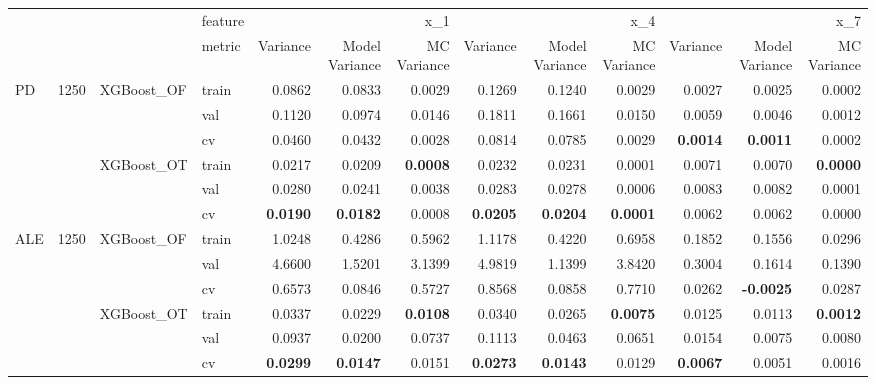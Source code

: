 \begin{tabular}{llllrrrrrrrrr}
 &  &  & feature & \multicolumn{3}{r}{x_1} & \multicolumn{3}{r}{x_4} & \multicolumn{3}{r}{x_7} \\
 &  &  & metric & Variance & Model Variance & MC Variance & Variance & Model Variance & MC Variance & Variance & Model Variance & MC Variance \\
\multirow[c]{6}{*}{PD} & \multirow[c]{6}{*}{1250} & \multirow[c]{3}{*}{XGBoost_OF} & train & 0.0862 & 0.0833 & 0.0029 & 0.1269 & 0.1240 & 0.0029 & 0.0027 & 0.0025 & 0.0002 \\
 &  &  & val & 0.1120 & 0.0974 & 0.0146 & 0.1811 & 0.1661 & 0.0150 & 0.0059 & 0.0046 & 0.0012 \\
 &  &  & cv & 0.0460 & 0.0432 & 0.0028 & 0.0814 & 0.0785 & 0.0029 & \bfseries 0.0014 & \bfseries 0.0011 & 0.0002 \\
 &  & \multirow[c]{3}{*}{XGBoost_OT} & train & 0.0217 & 0.0209 & \bfseries 0.0008 & 0.0232 & 0.0231 & 0.0001 & 0.0071 & 0.0070 & \bfseries 0.0000 \\
 &  &  & val & 0.0280 & 0.0241 & 0.0038 & 0.0283 & 0.0278 & 0.0006 & 0.0083 & 0.0082 & 0.0001 \\
 &  &  & cv & \bfseries 0.0190 & \bfseries 0.0182 & 0.0008 & \bfseries 0.0205 & \bfseries 0.0204 & \bfseries 0.0001 & 0.0062 & 0.0062 & 0.0000 \\
\multirow[c]{6}{*}{ALE} & \multirow[c]{6}{*}{1250} & \multirow[c]{3}{*}{XGBoost_OF} & train & 1.0248 & 0.4286 & 0.5962 & 1.1178 & 0.4220 & 0.6958 & 0.1852 & 0.1556 & 0.0296 \\
 &  &  & val & 4.6600 & 1.5201 & 3.1399 & 4.9819 & 1.1399 & 3.8420 & 0.3004 & 0.1614 & 0.1390 \\
 &  &  & cv & 0.6573 & 0.0846 & 0.5727 & 0.8568 & 0.0858 & 0.7710 & 0.0262 & \bfseries -0.0025 & 0.0287 \\
 &  & \multirow[c]{3}{*}{XGBoost_OT} & train & 0.0337 & 0.0229 & \bfseries 0.0108 & 0.0340 & 0.0265 & \bfseries 0.0075 & 0.0125 & 0.0113 & \bfseries 0.0012 \\
 &  &  & val & 0.0937 & 0.0200 & 0.0737 & 0.1113 & 0.0463 & 0.0651 & 0.0154 & 0.0075 & 0.0080 \\
 &  &  & cv & \bfseries 0.0299 & \bfseries 0.0147 & 0.0151 & \bfseries 0.0273 & \bfseries 0.0143 & 0.0129 & \bfseries 0.0067 & 0.0051 & 0.0016 \\
\end{tabular}
